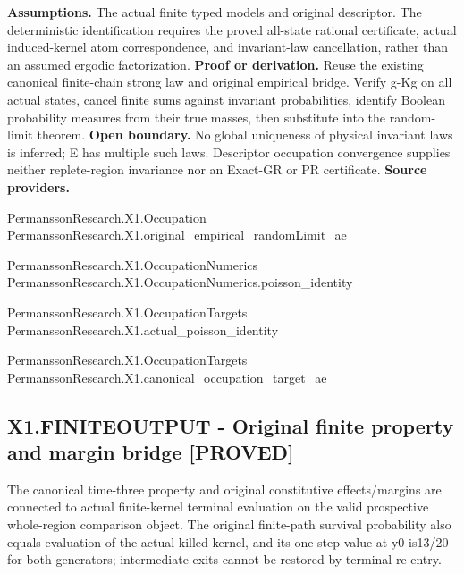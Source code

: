 \documentclass[11pt,a4paper]{article}
\begin{document}
\textbf{Assumptions.} The actual finite typed models and original descriptor. The deterministic identification requires the proved all-state rational certificate, actual induced-kernel atom correspondence, and invariant-law cancellation, rather than an assumed ergodic factorization.
\textbf{Proof or derivation.} Reuse the existing canonical finite-chain strong law and original empirical bridge. Verify g-Kg on all actual states, cancel finite sums against invariant probabilities, identify Boolean probability measures from their true masses, then substitute into the random-limit theorem.
\textbf{Open boundary.} No global uniqueness of physical invariant laws is inferred; E has multiple such laws. Descriptor occupation convergence supplies neither replete-region invariance nor an Exact-GR or PR certificate.
\textbf{Source providers.}
{\footnotesize\raggedright PermanssonRe\allowbreak{}search.X1.Oc\allowbreak{}cupation\\ PermanssonRe\allowbreak{}search.X1.or\allowbreak{}iginal\_empir\allowbreak{}ical\_randomL\allowbreak{}imit\_ae\par}
{\footnotesize\raggedright PermanssonRe\allowbreak{}search.X1.Oc\allowbreak{}cupationNume\allowbreak{}rics\\ PermanssonRe\allowbreak{}search.X1.Oc\allowbreak{}cupationNume\allowbreak{}rics.poisson\allowbreak{}\_identity\par}
{\footnotesize\raggedright PermanssonRe\allowbreak{}search.X1.Oc\allowbreak{}cupationTarg\allowbreak{}ets\\ PermanssonRe\allowbreak{}search.X1.ac\allowbreak{}tual\_poisson\allowbreak{}\_identity\par}
{\footnotesize\raggedright PermanssonRe\allowbreak{}search.X1.Oc\allowbreak{}cupationTarg\allowbreak{}ets\\ PermanssonRe\allowbreak{}search.X1.ca\allowbreak{}nonical\_occu\allowbreak{}pation\_targe\allowbreak{}t\_ae\par}
\subsection*{X1.FINITEOUTPUT - Original finite property and margin bridge [PROVED]}
The canonical time-three property and original constitutive effects/margins are connected to actual finite-kernel terminal evaluation on the valid prospective whole-region comparison object. The original finite-path survival probability also equals evaluation of the actual killed kernel, and its one-step value at y0 is13/20 for both generators; intermediate exits cannot be restored by terminal re-entry.
\end{document}
